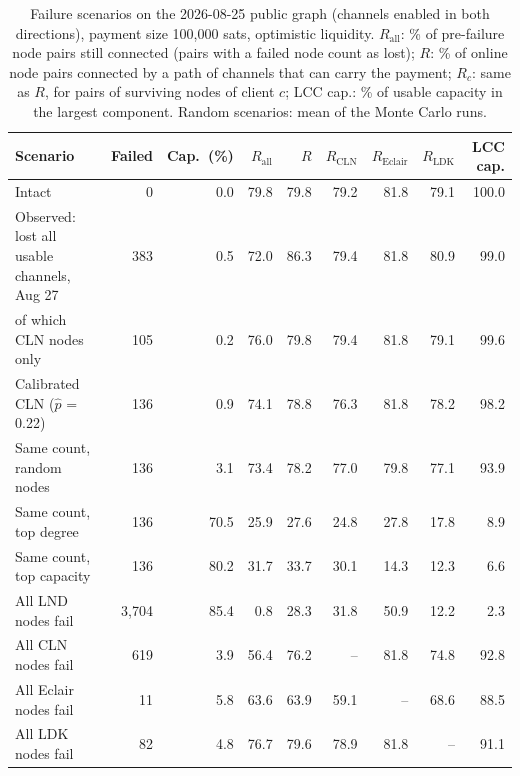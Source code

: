 \begin{table}[t]
\centering
\caption{Failure scenarios on the 2026-08-25 public graph (channels enabled in both
directions), payment size 100,000 sats, optimistic liquidity. $R_{\mathrm{all}}$: \% of pre-failure node pairs still connected (pairs with a failed
node count as lost); $R$: \% of online node pairs connected by a path of
channels that can carry the payment; $R_c$: same as $R$, for pairs of surviving nodes of client $c$; LCC cap.: \% of usable capacity in the largest
component. Random scenarios: mean of the Monte Carlo runs.}
\label{tab:scenarios}
\small
\begin{tabular}{lrrrrrrrr}
\toprule
Scenario & Failed & Cap.\ (\%) & $R_{\mathrm{all}}$ & $R$ & $R_{\mathrm{CLN}}$ & $R_{\mathrm{Eclair}}$ & $R_{\mathrm{LDK}}$ & LCC cap. \\
\midrule
Intact & 0 & 0.0 & 79.8 & 79.8 & 79.2 & 81.8 & 79.1 & 100.0 \\
Observed: lost all usable channels, Aug 27 & 383 & 0.5 & 72.0 & 86.3 & 79.4 & 81.8 & 80.9 & 99.0 \\
  of which CLN nodes only & 105 & 0.2 & 76.0 & 79.8 & 79.4 & 81.8 & 79.1 & 99.6 \\
Calibrated CLN ($\hat p$ = 0.22) & 136 & 0.9 & 74.1 & 78.8 & 76.3 & 81.8 & 78.2 & 98.2 \\
Same count, random nodes & 136 & 3.1 & 73.4 & 78.2 & 77.0 & 79.8 & 77.1 & 93.9 \\
Same count, top degree & 136 & 70.5 & 25.9 & 27.6 & 24.8 & 27.8 & 17.8 & 8.9 \\
Same count, top capacity & 136 & 80.2 & 31.7 & 33.7 & 30.1 & 14.3 & 12.3 & 6.6 \\
All LND nodes fail & 3,704 & 85.4 & 0.8 & 28.3 & 31.8 & 50.9 & 12.2 & 2.3 \\
All CLN nodes fail & 619 & 3.9 & 56.4 & 76.2 & -- & 81.8 & 74.8 & 92.8 \\
All Eclair nodes fail & 11 & 5.8 & 63.6 & 63.9 & 59.1 & -- & 68.6 & 88.5 \\
All LDK nodes fail & 82 & 4.8 & 76.7 & 79.6 & 78.9 & 81.8 & -- & 91.1 \\
\bottomrule
\end{tabular}
\end{table}
